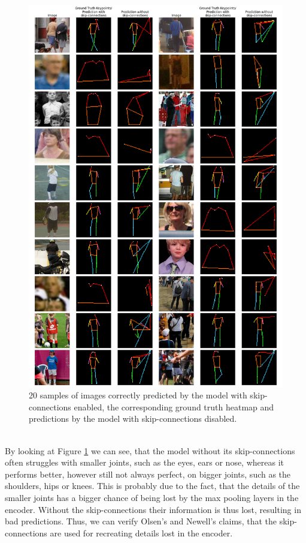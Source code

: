 \documentclass[./main.tex]{subfiles}
\begin{document}
\begin{figure}[p]
    \centering
    \includegraphics[width = \textwidth]{entities/pred_comparisons.png}
    \caption{20 samples of images correctly predicted by the model with skip-connections enabled, the corresponding ground truth heatmap and predictions by the model with skip-connections disabled.}
    \label{fig:pred_comparison}
\end{figure}
\\
By looking at Figure \ref{fig:pred_comparison} we can see, that the model without its skip-connections often struggles with smaller joints, such as the eyes, ears or nose, whereas it performs better, however still not always perfect, on bigger joints, such as the shoulders, hips or knees. This is probably due to the fact, that the details of the smaller joints has a bigger chance of being lost by the max pooling layers in the encoder. Without the skip-connections their information is thus lost, resulting in bad predictions. Thus, we can verify Olsen's \cite{Camilla} and Newell's \cite{Newell} claims, that the skip-connections are used for recreating details lost in the encoder. 
\end{document}
